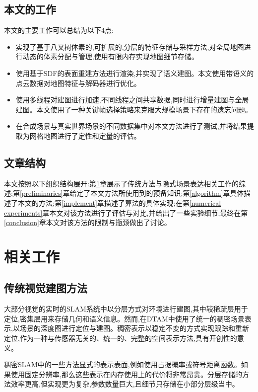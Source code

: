 \subsection{本文的工作}
本文的主要工作可以总结为以下4点:
\begin{itemize}
	\item 实现了基于八叉树体素的,可扩展的,分层的特征存储与采样方法,对全局地图进行动态的体素分配与管理,使用有限内存实现地图细节存储。
	\item 使用基于SDF的表面重建方法进行渲染,并实现了语义建图。本文使用带语义的点云数据对地图特征与解码器进行优化。
	\item 使用多线程对建图进行加速,不同线程之间共享数据,同时进行增量建图与全局建图。本文使用了一种关键帧选择策略来克服大规模场景下存在的遗忘问题。
	\item 在合成场景与真实世界场景的不同数据集中对本文方法进行了测试,并将结果提取为网格地图进行了定性和定量的评估。
\end{itemize}


\subsection{文章结构}
本文按照以下组织结构展开:第\ref{related work}章展示了传统方法与隐式场景表达相关工作的综述;第\ref{preliminaries}章给定了本文方法所使用到的预备知识;第\ref{algorithm}章具体描述了本文的方法;第\ref{implement}章描述了算法的具体实现;在第\ref{numerical experiments}章本文对该方法进行了评估与对比,并给出了一些实验细节;最终在第\ref{conclusion}章本文对该方法的限制与瓶颈做出了讨论。

\clearpage
\section{相关工作}\label{related work}

\subsection{传统视觉建图方法}
大部分视觉的实时的SLAM系统中以分层方式对环境进行建图,其中较稀疏层用于定位,密集层用来存储几何和语义信息。然而,在DTAM\cite{DTAM}中使用了统一的稠密场景表示,以场景的深度图进行定位与建图。稠密表示以稳定不变的方式实现跟踪和重新定位,作为一种与传感器无关的、统一的、完整的空间表示方法,具有开创性的意义。

稠密SLAM中的一些方法显式的表示表面,例如使用占据概率或符号距离函数。如果使用固定分辨率\cite{tradition1},那么这些表示在内存使用上的代价将非常昂贵。分层存储\cite{tradition2}的方法效率更高,但实现更为复杂,参数数量巨大,且细节只存储在小部分层级当中。

